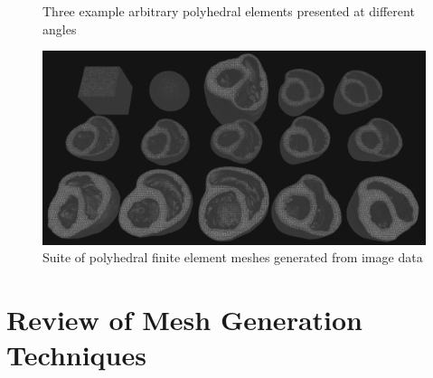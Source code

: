 \begin{figure}[ht]
{\label{fig:zoom5}}		

\caption{Three example arbitrary polyhedral elements presented at different angles}
\label{fig:zoom}
\end{figure}

\begin{figure}[ht]
\centering
\includegraphics[width=1.0\textwidth]{media/3-celeris/7-suite.png}
\caption{Suite of polyhedral finite element meshes generated from image data \vspace{1cm}}
\label{fig:celsuite}
\end{figure}



\section{Review of Mesh Generation Techniques}
\label{Review of Mesh Generation Techniques}

